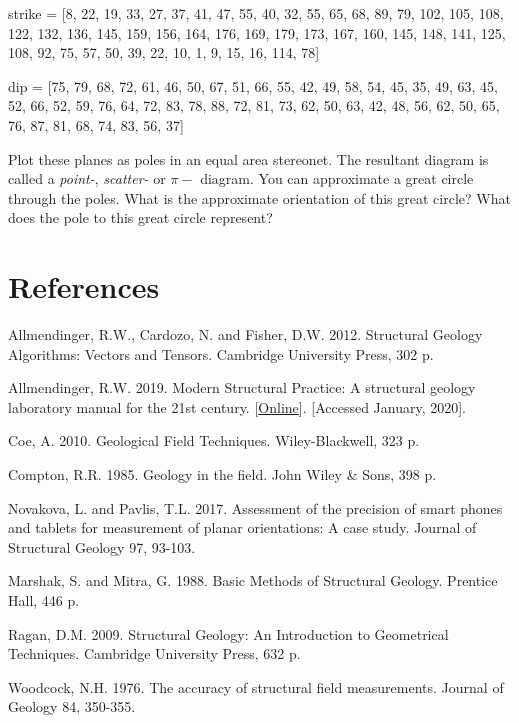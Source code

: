 \documentclass[a4paper , 12pt]{book}
\begin{document}
\begin{enumerate}
  strike = [8, 22, 19, 33, 27, 37, 41, 47, 55, 40, 32, 55, 65, 68, 89, 79, 102, 105, 108, 122, 132, 136, 145, 159, 156, 164, 176, 169, 179, 173, 167, 160, 145, 148, 141, 125, 108, 92, 75, 57, 50, 39, 22, 10, 1, 9, 15, 16, 114, 78]
  
  dip = [75, 79, 68, 72, 61, 46, 50, 67, 51, 66, 55, 42, 49, 58, 54, 45, 35, 49, 63, 45, 52, 66, 52, 59, 76, 64, 72, 83, 78, 88, 72, 81, 73, 62, 50, 63, 42, 48, 56, 62, 50, 65, 76, 87, 81, 68, 74, 83, 56, 37]
  
  Plot these planes as poles in an equal area stereonet. The resultant diagram is called a \textit{point-}, \textit{scatter-} or $\pi-$ diagram. You can approximate a great circle through the poles. What is the approximate orientation of this great circle? What does the pole to this great circle represent?
  
\end{enumerate}

\section*{References}

Allmendinger, R.W., Cardozo, N. and Fisher, D.W. 2012. Structural Geology Algorithms: Vectors and Tensors. Cambridge University Press, 302 p.

Allmendinger, R.W. 2019. Modern Structural Practice: A structural geology laboratory manual for the 21st century. [\href{http://www.geo.cornell.edu/geology/faculty/RWA/structure-lab-manual}{Online}]. [Accessed January, 2020].

Coe, A. 2010. Geological Field Techniques. Wiley-Blackwell, 323 p.

Compton, R.R. 1985. Geology in the field. John Wiley \& Sons, 398 p.

Novakova, L. and Pavlis, T.L. 2017. Assessment of the precision of smart phones and tablets for measurement of planar orientations: A case study. Journal of Structural Geology 97, 93-103.

Marshak, S. and Mitra, G. 1988. Basic Methods of Structural Geology. Prentice Hall, 446 p.

Ragan, D.M. 2009. Structural Geology: An Introduction to Geometrical Techniques. Cambridge University Press, 632 p.

Woodcock, N.H. 1976. The accuracy of structural field measurements. Journal of Geology 84, 350-355.

\end{document}
